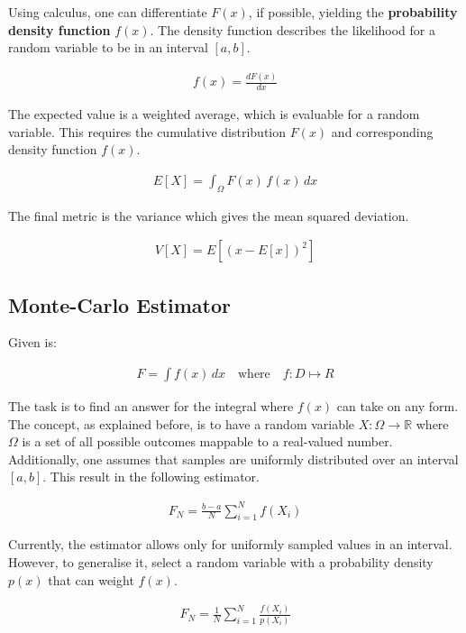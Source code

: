 Using calculus, one can differentiate $F(x)$, if possible, yielding the \textbf{probability density function} $f(x)$.
The density function describes the likelihood for a random variable to be in an interval $[a,b]$.

\begin{align*}
f(x)=\frac{dF(x)}{dx}
\end{align*}

The expected value is a weighted average, which is evaluable for a random variable.
This requires the cumulative distribution $F(x)$ and corresponding density function $f(x)$.

\begin{align*}
E[X]=\int_{\Omega}F(x)\,f(x)\,dx
\end{align*}

The final metric is the variance which gives the mean squared deviation.

\begin{align*}
V[X]=E\left[(x-E[x])^2\right]
\end{align*}

\subsection{Monte-Carlo Estimator}

Given is:

\begin{align*}
F=\int f(x)\,dx\quad\text{where}\quad f:D \mapsto R
\end{align*}

The task is to find an answer for the integral where $f(x)$ can take on any form.
The concept, as explained before, is to have a random variable $X:\Omega\rightarrow\mathbb{R}$ where $\Omega$ is a set of all possible outcomes mappable to a real-valued number.
Additionally, one assumes that samples are uniformly distributed over an interval $[a,b]$.
This result in the following estimator.

\begin{align*}
F_N=\frac{b-a}{N}\sum_{i=1}^{N}f(X_i)
\end{align*}

Currently, the estimator allows only for uniformly sampled values in an interval.
However, to generalise it, select a random variable with a probability density $p(x)$ that can weight $f(x)$.

\begin{align}
F_N=\frac{1}{N}\sum_{i=1}^{N}\frac{f(X_i)}{p(X_i)} \label{eq:mc-estimator}
\end{align}

